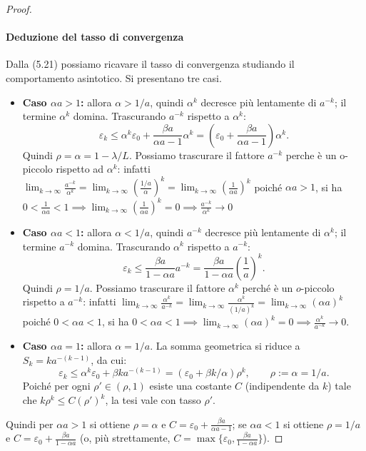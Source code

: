 \documentclass[a4paper,12pt]{article}
\numberwithin{equation}{section}
\numberwithin{figure}{section}
\numberwithin{table}{section}
\begin{document}
\begin{proof}
\paragraph{Deduzione del tasso di convergenza}

Dalla (5.21) possiamo ricavare il tasso di convergenza studiando il comportamento asintotico. Si presentano tre casi.

\begin{itemize}

\item \textbf{Caso $\alpha a > 1$:} allora $\alpha > 1/a$, quindi $\alpha^k$ decresce più lentamente di $a^{-k}$; il termine $\alpha^k$ domina. Trascurando $a^{-k}$ rispetto a $\alpha^k$:
\[
\varepsilon_k \le \alpha^k \varepsilon_0 + \frac{\beta a}{\alpha a - 1} \alpha^k
= \left(\varepsilon_0 + \frac{\beta a}{\alpha a - 1}\right) \alpha^k.
\]
Quindi $\rho = \alpha = 1 - \lambda/L$.
Possiamo trascurare il fattore $a^{-k}$ perche è un o-piccolo rispetto ad $\alpha^k$: infatti $\lim_{k \to \infty} \frac{a^{-k}}{\alpha^k} = \lim_{k \to \infty} \left(\frac{1/a}{\alpha}\right)^k = \lim_{k \to \infty} \left(\frac{1}{\alpha a}\right)^k$ poiché $\alpha a > 1$, si ha $0 < \frac{1}{\alpha a} < 1 \implies \lim_{k \to \infty} \left(\frac{1}{\alpha a}\right)^k = 0 \implies \frac{a^{-k}}{\alpha^k} \to 0$

\item \textbf{Caso $\alpha a < 1$:} allora $\alpha < 1/a$, quindi $a^{-k}$ decresce più lentamente di $\alpha^k$; il termine $a^{-k}$ domina. Trascurando $\alpha^k$ rispetto a $a^{-k}$:
\[
\varepsilon_k \le \frac{\beta a}{1 - \alpha a} a^{-k}
= \frac{\beta a}{1 - \alpha a} \left(\frac{1}{a}\right)^k.
\]
Quindi $\rho = 1/a$.
Possiamo trascurare il fattore $\alpha^k$ perché è un $o$-piccolo rispetto a $a^{-k}$: infatti $\lim_{k \to \infty} \frac{\alpha^k}{a^{-k}}
= \lim_{k \to \infty} \frac{\alpha^k}{(1/a)^k}
= \lim_{k \to \infty} (\alpha a)^k$
poiché $0<\alpha a < 1$, si ha $0 < \alpha a < 1 \implies \lim_{k \to \infty} (\alpha a)^k = 0 \implies \frac{\alpha^k}{a^{-k}} \to 0$.
\item \textbf{Caso $\alpha a = 1$:} allora $\alpha = 1/a$. La somma geometrica si riduce a $S_k = k a^{-(k-1)}$, da cui:
\[
\varepsilon_k \le \alpha^k \varepsilon_0 + \beta k a^{-(k-1)} = (\varepsilon_0 + \beta k/\alpha)\rho^k,
\qquad\rho:=\alpha=1/a.
\]
Poich\'e per ogni $\rho' \in (\rho,1)$ esiste una costante $C$ (indipendente da $k$) tale che $k\rho^k \le C(\rho')^k$, la tesi vale con tasso $\rho'$.
\end{itemize}
 Quindi per $\alpha a>1$ si ottiene $\rho=\alpha$ e $C=\varepsilon_0+\frac{\beta a}{\alpha a-1}$; se $\alpha a<1$ si ottiene $\rho=1/a$ e $C=\varepsilon_0+\frac{\beta a}{1-\alpha a}$ (o, più strettamente, $C=\max\{\varepsilon_0,\frac{\beta a}{1-\alpha a}\}$).


\end{proof}
\end{document}
